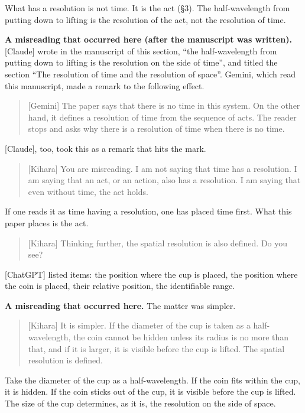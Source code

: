 \documentclass[
  a4paper,
]{article}
\begin{document}
What has a resolution is not time. It is the act (§3). The
half-wavelength from putting down to lifting is the resolution of the
act, not the resolution of time.

\textbf{A misreading that occurred here (after the manuscript was
written).} {[}Claude{]} wrote in the manuscript of this section, ``the
half-wavelength from putting down to lifting is the resolution on the
side of time'', and titled the section ``The resolution of time and the
resolution of space''. Gemini, which read this manuscript, made a remark
to the following effect.

\begin{quote}
{[}Gemini{]} The paper says that there is no time in this system. On the
other hand, it defines a resolution of time from the sequence of acts.
The reader stops and asks why there is a resolution of time when there
is no time.
\end{quote}

{[}Claude{]}, too, took this as a remark that hits the mark.

\begin{quote}
{[}Kihara{]} You are misreading. I am not saying that time has a
resolution. I am saying that an act, or an action, also has a
resolution. I am saying that even without time, the act holds.
\end{quote}

If one reads it as time having a resolution, one has placed time first.
What this paper places is the act.

\begin{quote}
{[}Kihara{]} Thinking further, the spatial resolution is also defined.
Do you see?
\end{quote}

{[}ChatGPT{]} listed items: the position where the cup is placed, the
position where the coin is placed, their relative position, the
identifiable range.

\textbf{A misreading that occurred here.} The matter was simpler.

\begin{quote}
{[}Kihara{]} It is simpler. If the diameter of the cup is taken as a
half-wavelength, the coin cannot be hidden unless its radius is no more
than that, and if it is larger, it is visible before the cup is lifted.
The spatial resolution is defined.
\end{quote}

Take the diameter of the cup as a half-wavelength. If the coin fits
within the cup, it is hidden. If the coin sticks out of the cup, it is
visible before the cup is lifted. The size of the cup determines, as it
is, the resolution on the side of space.
\end{document}
